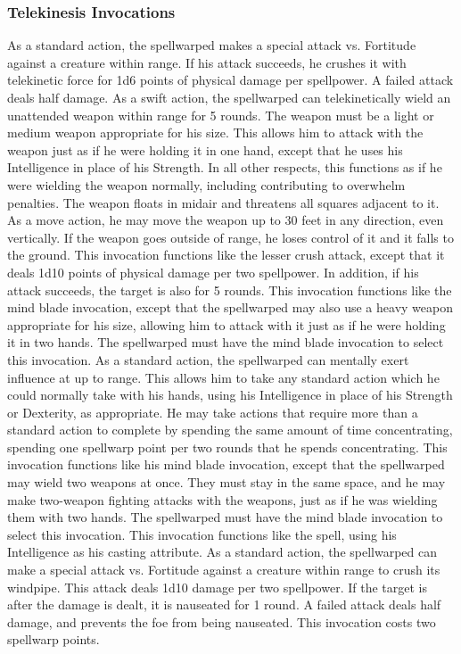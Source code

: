 \subsubsection{Telekinesis Invocations}
As a standard action, the spellwarped makes a special attack vs. Fortitude against a creature within \rngclose range.
If his attack succeeds, he crushes it with telekinetic force for 1d6 points of physical damage  per spellpower.
A failed attack deals half damage.
As a swift action, the spellwarped can telekinetically wield an unattended weapon within \rngclose range for 5 rounds.
The weapon must be a light or medium weapon appropriate for his size.
This allows him to attack with the weapon just as if he were holding it in one hand, except that he uses his Intelligence in place of his Strength.
In all other respects, this functions as if he were wielding the weapon normally, including contributing to overwhelm penalties.
The weapon floats in midair and threatens all squares adjacent to it.
As a move action, he may move the weapon up to 30 feet in any direction, even vertically.
If the weapon goes outside of \rngclose range, he loses control of it and it falls to the ground.
This invocation functions like the lesser crush attack, except that it deals 1d10 points of physical damage per two spellpower.
In addition, if his attack succeeds, the target is also \sickened for 5 rounds.
This invocation functions like the mind blade invocation, except that the spellwarped may also use a heavy weapon appropriate for his size, allowing him to attack with it just as if he were holding it in two hands.
The spellwarped must have the mind blade invocation to select this invocation.
As a standard action, the spellwarped can mentally exert influence at up to \rngclose range.
This allows him to take any standard action which he could normally take with his hands, using his Intelligence in place of his Strength or Dexterity, as appropriate.
He may take actions that require more than a standard action to complete by spending the same amount of time concentrating, spending one spellwarp point per two rounds that he spends concentrating.
This invocation functions like his mind blade invocation, except that the spellwarped may wield two weapons at once.
They must stay in the same space, and he may make two-weapon fighting attacks with the weapons, just as if he was wielding them with two hands.
The spellwarped must have the mind blade invocation to select this invocation.
 This invocation functions like the 
spell, using his Intelligence as his casting attribute.
As a standard action, the spellwarped can make a special attack vs. Fortitude against a creature within \rngclose range to crush its windpipe.
This attack deals 1d10 damage per two spellpower.
If the target is \bloodied after the damage is dealt, it is nauseated for 1 round.
A failed attack deals half damage, and prevents the foe from being nauseated.
This invocation costs two spellwarp points.

